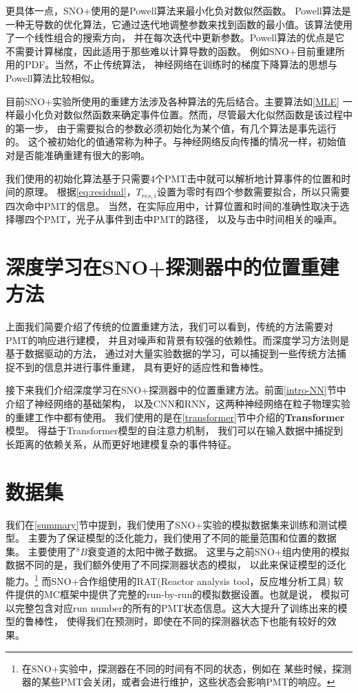更具体一点，SNO+使用的是Powell算法\cite{powell1964efficient}来最小化负对数似然函数。
Powell算法是一种无导数的优化算法，它通过迭代地调整参数来找到函数的最小值。该算法使用了一个线性组合的搜索方向，
并在每次迭代中更新参数。Powell算法的优点是它不需要计算梯度，因此适用于那些难以计算导数的函数。
例如SNO+目前重建所用的PDF。当然，不止传统算法，
神经网络在训练时的梯度下降算法的思想与Powell算法比较相似。

目前SNO+实验所使用的重建方法涉及各种算法的先后结合。主要算法如\ref{MLE}
一样最小化负对数似然函数来确定事件位置。然而，尽管最大化似然函数是该过程中的第一步，
由于需要拟合的参数必须初始化为某个值，有几个算法是事先运行的。
这个被初始化的值通常称为种子。与神经网络反向传播的情况一样，初始值对是否能准确重建有很大的影响。

我们使用的初始化算法基于只需要4个PMT击中就可以解析地计算事件的位置和时间的原理。
根据\ref{eq:residual}，$T_{res,i}$设置为零时有四个参数需要拟合，所以只需要四次命中PMT的信息。
当然，在实际应用中，计算位置和时间的准确性取决于选择哪四个PMT，光子从事件到击中PMT的路径，
以及与击中时间相关的噪声。

\section{深度学习在SNO+探测器中的位置重建方法}\label{sec:dl_reconstruction}

上面我们简要介绍了传统的位置重建方法，我们可以看到，传统的方法需要对PMT的响应进行建模，
并且对噪声和背景有较强的依赖性。而深度学习方法则是基于数据驱动的方法，
通过对大量实验数据的学习，可以捕捉到一些传统方法捕捉不到的信息并进行事件重建，
具有更好的适应性和鲁棒性。

接下来我们介绍深度学习在SNO+探测器中的位置重建方法。前面\ref{intro-NN}节中介绍了神经网络的基础架构，
以及CNN和RNN，这两种神经网络在粒子物理实验的重建工作中都有使用。
我们使用的是在\ref{transformer}节中介绍的\textbf{Transformer}模型。
得益于Transformer模型的自注意力机制，
我们可以在输入数据中捕捉到长距离的依赖关系，从而更好地建模复杂的事件特征。

\section{数据集}\label{dataset}

我们在\ref{summary}节中提到，我们使用了SNO+实验的模拟数据集来训练和测试模型。
主要为了保证模型的泛化能力，我们使用了不同的能量范围和位置的数据集。
主要使用了${}^{8}B$衰变道的太阳中微子数据。
这里与之前SNO+组内使用的模拟数据不同的是，我们额外使用了不同探测器状态的模拟，
以此来保证模型的泛化能力。\footnote{在SNO+实验中，探测器在不同的时间有不同的状态，例如在
某些时候，探测器的某些PMT会关闭，或者会进行维护，这些状态会影响PMT的响应。}
而SNO+合作组使用的RAT(Reactor analysis tool，反应堆分析工具)
软件提供的MC框架中提供了完整的run-by-run的模拟数据设置。也就是说，
模拟可以完整包含对应run number的所有的PMT状态信息。这大大提升了训练出来的模型的鲁棒性，
使得我们在预测时，即使在不同的探测器状态下也能有较好的效果。

